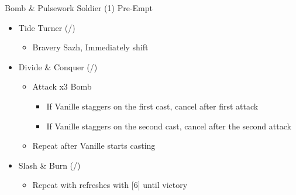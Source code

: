 \documentclass{report}
\begin{document}
\renewcommand{\first}{[1] Slash \& Burn (\com/\rav)}
\renewcommand{\second}{[2] Tide Turner (\syn/\sab)}
\renewcommand{\third}{[3] Divide \& Conquer (\com/\sab)}
\renewcommand{\fourth}{[4] Dualcasting (\rav/\rav)}
\renewcommand{\fifth}{[5] Undermine (\rav/\sab)}
\renewcommand{\sixth}{[6] Slash \& Burn (\com/\rav)}




\begin{battle}{Bomb \& Pulsework Soldier (1) Pre-Empt}
\begin{itemize}
    \item \second
    \begin{itemize}
        \item Bravery Sazh, Immediately shift
    \end{itemize}
    \item \third
    \begin{itemize}
        \item Attack x3 Bomb
        \begin{itemize}
            \item If Vanille staggers on the first cast, cancel after first attack
            \item If Vanille staggers on the second cast, cancel after the second attack
        \end{itemize}
        \item Repeat after Vanille starts casting
    \end{itemize}
    \item \first
    \begin{itemize}
        \item Repeat with refreshes with [6] until victory
    \end{itemize}
\end{itemize}
\end{battle}
\end{document}
